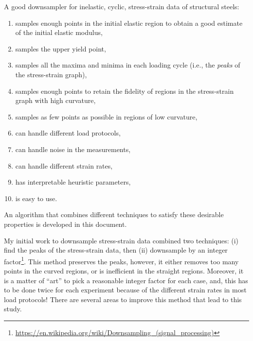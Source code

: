 \documentclass[a4paper,11pt]{article}
\begin{document}
A good downsampler for inelastic, cyclic, stress-strain data of structural steels:
\begin{enumerate}
    \item samples enough points in the initial elastic region to obtain a good estimate of the initial elastic modulus,
    \item samples the upper yield point,
    \item samples all the maxima and minima in each loading cycle (i.e., the \emph{peaks} of the stress-strain graph),
    \item samples enough points to retain the fidelity of regions in the stress-strain graph with high curvature,
    \item samples as few points as possible in regions of low curvature,
    \item can handle different load protocols,
    \item can handle noise in the measurements,
    \item can handle different strain rates,
    \item has interpretable heuristic parameters,
    \item is easy to use.
\end{enumerate}
An algorithm that combines different techniques to satisfy these desirable properties is developed in this document.

My initial work to downsample stress-strain data combined two techniques: (i) find the peaks of the stress-strain data, then (ii) downsample by an integer factor\footnote{\url{https://en.wikipedia.org/wiki/Downsampling_(signal_processing)}}.
This method preserves the peaks, however, it either removes too many points in the curved regions, or is inefficient in the straight regions.
Moreover, it is a matter of ``art'' to pick a reasonable integer factor for each case, and, this has to be done twice for each experiment because of the different strain rates in most load protocols!
There are several areas to improve this method that lead to this study.
\end{document}

